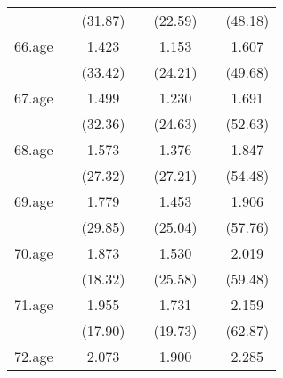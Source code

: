 {\begin{tabular}{l*{6}{c}}
            &                     &     (31.87)         &                     &     (22.59)         &                     &     (48.18)         \\
[1em]
66.age      &                     &       1.423\sym{***}&                     &       1.153\sym{***}&                     &       1.607\sym{***}\\
            &                     &     (33.42)         &                     &     (24.21)         &                     &     (49.68)         \\
[1em]
67.age      &                     &       1.499\sym{***}&                     &       1.230\sym{***}&                     &       1.691\sym{***}\\
            &                     &     (32.36)         &                     &     (24.63)         &                     &     (52.63)         \\
[1em]
68.age      &                     &       1.573\sym{***}&                     &       1.376\sym{***}&                     &       1.847\sym{***}\\
            &                     &     (27.32)         &                     &     (27.21)         &                     &     (54.48)         \\
[1em]
69.age      &                     &       1.779\sym{***}&                     &       1.453\sym{***}&                     &       1.906\sym{***}\\
            &                     &     (29.85)         &                     &     (25.04)         &                     &     (57.76)         \\
[1em]
70.age      &                     &       1.873\sym{***}&                     &       1.530\sym{***}&                     &       2.019\sym{***}\\
            &                     &     (18.32)         &                     &     (25.58)         &                     &     (59.48)         \\
[1em]
71.age      &                     &       1.955\sym{***}&                     &       1.731\sym{***}&                     &       2.159\sym{***}\\
            &                     &     (17.90)         &                     &     (19.73)         &                     &     (62.87)         \\
[1em]
72.age      &                     &       2.073\sym{***}&                     &       1.900\sym{***}&                     &       2.285\sym{***}\\

\end{tabular}}
